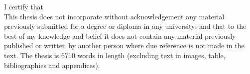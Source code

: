 
\begin{declaration}

I certify that\\

This thesis does not incorporate without acknowledgement any material previously submitted for a degree or diploma in any university; and that to the best of my knowledge and belief it does not contain any material previously published or written by another person where due reference is not made in the text. The thesis is 6710 words in length (excluding text in images, table, bibliographies and appendices).





\end{declaration}

